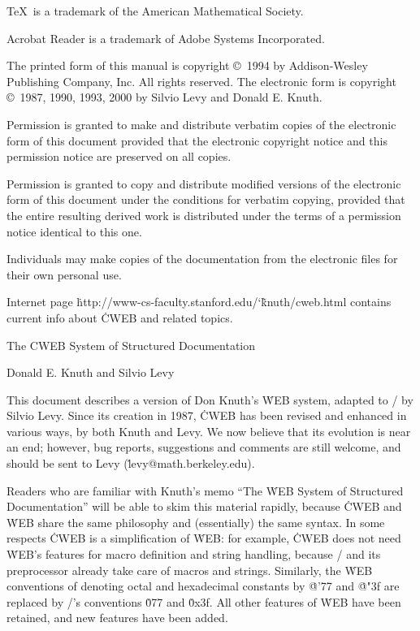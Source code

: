 \noindent
\TeX\ is a trademark of the American Mathematical Society.

\noindent
Acrobat Reader is a trademark of Adobe Systems Incorporated.

\bigskip\noindent
The printed form of this manual is copyright \copyright\ 1994
  by Addison-Wesley Publishing Company, Inc.  All rights reserved.
\smallskip\noindent
The electronic form is copyright \copyright\ 1987, 1990, 1993, 2000
  by Silvio Levy and Donald E. Knuth.

\bigskip\noindent
Permission is granted to make and distribute verbatim copies of the
electronic form of this document provided that the electronic copyright
notice and this permission notice are preserved on all copies.

\smallskip\noindent
Permission is granted to copy and distribute modified versions of the
electronic form of this document under the conditions for verbatim copying,
provided that the entire resulting derived work is distributed under the terms
of a permission notice identical to this one.

\smallskip\noindent
Individuals may make copies of the documentation from the electronic files
for their own personal use.

\smallskip\noindent
Internet page \.{http://www-cs-faculty.stanford.edu/\char`\~knuth/cweb.html}
contains current info about \.{CWEB} and related topics.

 \titletrue\eject\null\vfill\titletrue\eject{}

\titletrue
\centerline{\titlefont The {\ttitlefont CWEB} System of
    Structured Documentation}

\centerline{\authorfont Donald E. Knuth and Silvio Levy}

\noindent
This document describes a version of Don Knuth's \.{WEB} system,
adapted to \CEE/ by Silvio Levy.  Since its creation in 1987, \.{CWEB}
has been revised and enhanced in various ways, by both Knuth and Levy.
We now believe that its evolution is near an end; however, bug
reports, suggestions and comments are still welcome, and
should be sent to Levy (\.{levy@math.berkeley.edu}).

Readers who are familiar with Knuth's memo ``The \.{WEB} System of Structured
Documentation'' will be able
to skim this material rapidly, because \.{CWEB} and \.{WEB} share
the same philosophy and (essentially) the same syntax.  In some respects
\.{CWEB} is a simplification
of \.{WEB}: for example, \.{CWEB} does not need \.{WEB}'s features
for macro definition and string handling, because \CEE/ and its
preprocessor already take care of macros and strings. Similarly, the \.{WEB}
conventions of denoting octal and hexadecimal constants by \.{@'77}
and \.{@"3f} are replaced by \CEE/'s conventions \.{077} and
\.{0x3f}. All other features of \.{WEB} have been
retained, and new features have been added.

